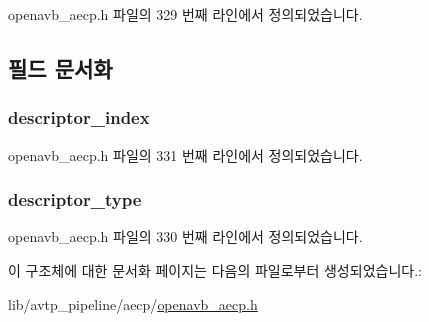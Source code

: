 openavb\+\_\+aecp.\+h 파일의 329 번째 라인에서 정의되었습니다.



\subsection{필드 문서화}
\subsubsection[{\texorpdfstring{descriptor\+\_\+index}{descriptor_index}}]{ descriptor\+\_\+index}\hypertarget{structopenavb__aecp__command__data__get__counters__t_ab26fb363c24b9a2a4391f9171c981b08}{}\label{structopenavb__aecp__command__data__get__counters__t_ab26fb363c24b9a2a4391f9171c981b08}


openavb\+\_\+aecp.\+h 파일의 331 번째 라인에서 정의되었습니다.

\subsubsection[{\texorpdfstring{descriptor\+\_\+type}{descriptor_type}}]{ descriptor\+\_\+type}\hypertarget{structopenavb__aecp__command__data__get__counters__t_a1e231d7874aada5925b29affc76782cc}{}\label{structopenavb__aecp__command__data__get__counters__t_a1e231d7874aada5925b29affc76782cc}


openavb\+\_\+aecp.\+h 파일의 330 번째 라인에서 정의되었습니다.



이 구조체에 대한 문서화 페이지는 다음의 파일로부터 생성되었습니다.\+:\begin{DoxyCompactItemize}
\item 
lib/avtp\+\_\+pipeline/aecp/\hyperlink{openavb__aecp_8h}{openavb\+\_\+aecp.\+h}\end{DoxyCompactItemize}
